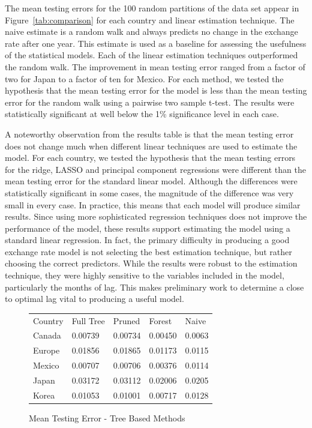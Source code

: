 \documentclass{sig-alternate-05-2015}
\begin{document}
The mean testing errors for the 100 random partitions of the data set appear in Figure~\ref{tab:comparison} for each country and linear estimation technique. The naive estimate is a random walk and always predicts no change in the exchange rate after one year. This estimate is used as a baseline for assessing the usefulness of the statistical models. Each of the linear estimation techniques outperformed the random walk. The improvement in mean testing error ranged from a factor of two for Japan to a factor of ten for Mexico. For each method, we tested the hypothesis that the mean testing error for the model is less than the mean testing error for the random walk using a pairwise two sample t-test. The results were statistically significant at well below the 1\% significance level in each case.
\par{} A noteworthy observation from the results table is that the mean testing error does not change much when different linear techniques are used to estimate the model. For each country, we tested the hypothesis that the mean testing errors for the ridge, LASSO and principal component regressions were different than the mean testing error for the standard linear model. Although the differences were statistically significant in some cases, the magnitude of the difference was very small in every case. In practice, this means that each model will produce similar results. Since using more sophisticated regression techniques does not improve the performance of the model, these results support estimating the model using a standard linear regression. In fact, the primary difficulty in producing a good exchange rate model is not selecting the best estimation technique, but rather choosing the correct predictors. While the results were robust to the estimation technique, they were highly sensitive to the variables included in the model, particularly the months of lag. This makes preliminary work to determine a close to optimal lag vital to producing a useful model.

\begin{figure}
\centering
\caption{Mean Testing Error - Tree Based Methods}
\begin{tabular}{l l l l l}
Country	& Full Tree & Pruned    & Forest    & Naive \\
Canada 	& 0.00739 	& 0.00734 	& 0.00450 	& 0.0063 \\
Europe	& 0.01856 	& 0.01865 	& 0.01173	& 0.0115 \\
Mexico	& 0.00707 	& 0.00706 	& 0.00376   & 0.0114 \\
Japan	& 0.03172 	& 0.03112 	& 0.02006   & 0.0205 \\
Korea	& 0.01053 	& 0.01001 	& 0.00717	& 0.0128 \\
\end{tabular}
\label{tab:treecomparison}
\end{figure} 
\end{document}
